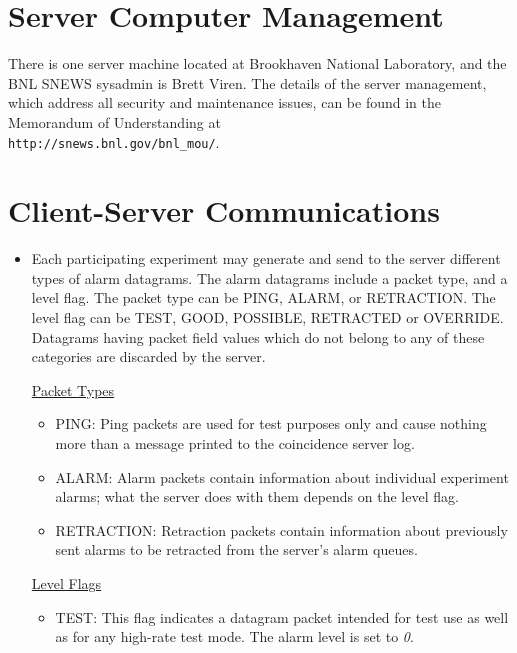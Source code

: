 \documentclass{article}
\begin{document}
\section{Server Computer Management}

There is one server machine located at Brookhaven
National Laboratory, and the BNL SNEWS sysadmin is Brett Viren.
The details of the server management, which address all
security and maintenance issues, can be found
in the Memorandum of Understanding at\\
{\tt http://snews.bnl.gov/bnl\_mou/}.

\section{Client-Server Communications}\label{alarm}
\begin{itemize}

\item Each participating experiment may generate and send to the server
different types of alarm datagrams.
The alarm datagrams include a packet type, and a level flag.
The packet type can be PING, ALARM, or RETRACTION.
The level flag can be TEST, GOOD, POSSIBLE, RETRACTED or OVERRIDE.  
Datagrams having packet field values which do not 
belong to any of these categories are discarded by the server.

\noindent \underline{Packet Types}

\begin{itemize}
\item PING: Ping packets are used for test purposes only
and cause nothing more than a message printed to the coincidence
server log.

\item ALARM: Alarm packets contain information about individual
experiment alarms; what the server does with them depends on the
level flag.

\item RETRACTION:  Retraction packets contain information about
previously sent alarms to be retracted from the server's alarm queues.

\end{itemize}

\noindent \underline{Level Flags}

\begin{itemize}

\item TEST: This flag indicates a datagram packet intended for test use
as well as for any high-rate test mode.  The alarm level
is set to {\it 0}.


\end{itemize}
\end{itemize}
\end{document}
